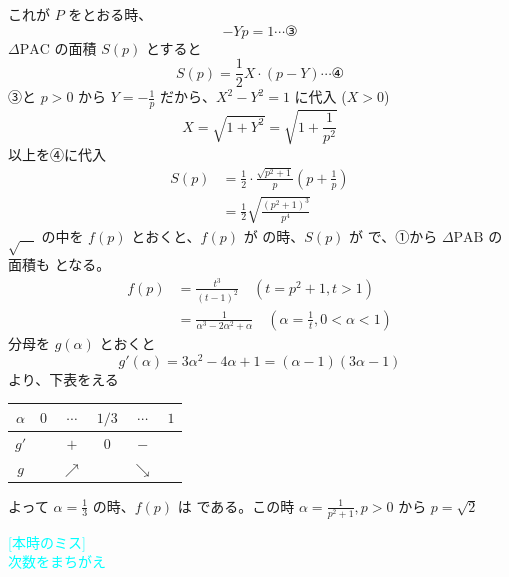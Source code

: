 \documentclass[../main.tex]{subfiles}
\begin{document}
これが $P$ をとおる時、
\[
  -Yp = 1 \cdots \text{③}
\]
$\Delta \text{PAC}$ の面積 $S(p)$ とすると
\[
  S(p) = \frac{1}{2}X \cdot (p-Y) \cdots \text{④}
\]
③と $p>0$ から $Y = -\frac{1}{p}$ だから、$X^2-Y^2=1$ に代入 ($X>0$)
\[
  X = \sqrt{1+Y^2} = \sqrt{1+\frac{1}{p^2}}
\]
以上を④に代入
\begin{align*}
  S(p) &= \frac{1}{2} \cdot \frac{\sqrt{p^2+1}}{p}\left(p+\frac{1}{p}\right) \\
  &= \frac{1}{2} \sqrt{\frac{(p^2+1)^3}{p^4}}
\end{align*}
$\sqrt{\quad}$ の中を $f(p)$ とおくと、$f(p)$ が \min の時、$S(p)$ が \min で、①から $\Delta \text{PAB}$ の面積も \min となる。
\begin{align*}
  f(p) &= \frac{t^3}{(t-1)^2} \quad (t=p^2+1, t>1) \\
  &= \frac{1}{\alpha^3-2\alpha^2+\alpha} \quad \left(\alpha=\frac{1}{t}, 0<\alpha<1\right)
\end{align*}
分母を $g(\alpha)$ とおくと
\[
  g'(\alpha) = 3\alpha^2-4\alpha+1 = (\alpha-1)(3\alpha-1)
\]
より、下表をえる

\begin{center}
  \begin{tabular}{|c|c|c|c|c|c|}
    \hline
    $\alpha$ & $0$ & $\cdots$ & $1/3$ & $\cdots$ & $1$ \\
    \hline
    $g'$ & & $+$ & $0$ & $-$ & \\
    \hline
    $g$ & & $\nearrow$ & & $\searrow$ & \\
    \hline
  \end{tabular}
\end{center}
よって $\alpha = \frac{1}{3}$ の時、$f(p)$ は \min である。この時 $\alpha = \frac{1}{p^2+1}, p>0$ から $p = \sqrt{2}$

\textcolor{cyan}{[本時のミス]}\\
\textcolor{cyan}{次数をまちがえ}
\end{document}
